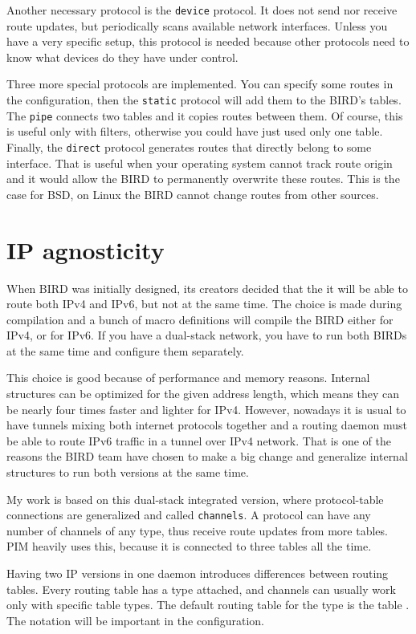 Another necessary protocol is the \texttt{device} protocol. It does not send
nor receive route updates, but periodically scans available network interfaces.
Unless you have a very specific setup, this protocol is needed because other
protocols need to know what devices do they have under control.

Three more special protocols are implemented. You can specify some routes in
the configuration, then the \texttt{static} protocol will add them to the BIRD's
tables. The \texttt{pipe} connects two tables and it copies routes between
them. Of course, this is useful only with filters, otherwise you could have
just used only one table. Finally, the \texttt{direct} protocol generates routes
that directly belong to some interface. That is useful when your operating
system cannot track route origin and it would allow the BIRD to permanently
overwrite these routes. This is the case for BSD, on Linux the BIRD cannot
change routes from other sources.

\section{IP agnosticity}
When BIRD was initially designed, its creators decided that the it will be able to
route both IPv4 and IPv6, but not at the same time. The choice is made during
compilation and a bunch of macro definitions will compile the BIRD either for
IPv4, or for IPv6. If you have a dual-stack network, you have to run both BIRDs
at the same time and configure them separately.

This choice is good because of performance and memory reasons. Internal
structures can be optimized for the given address length, which means they can be
nearly four times faster and lighter for IPv4. However, nowadays it is usual to
have tunnels mixing both internet protocols together and a routing daemon must
be able to route IPv6 traffic in a tunnel over IPv4 network. That is one of the
reasons the BIRD team have chosen to make a big change and generalize internal
structures to run both versions at the same time.

My work is based on this dual-stack integrated version, where protocol-table connections
are generalized and called \texttt{channels}. A protocol can have any number of
channels of any type, thus receive route updates from more tables. PIM heavily
uses this, because it is connected to three tables all the time.

Having two IP versions in one daemon introduces differences between routing
tables. Every routing table has a type attached, and channels can usually work
only with specific table types. The default routing table for the type
 is the table . The notation will be important in the
configuration.

